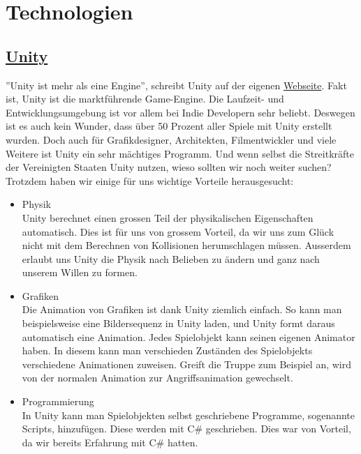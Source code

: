 \chapter{Technologien}

\section{\href{https://unity.com/}{Unity}}
''Unity ist mehr als eine Engine'', schreibt Unity auf der eigenen \href{https://unity.com/pages/more-than-an-engine}{Webseite}. Fakt ist, Unity ist die marktführende Game-Engine. Die Laufzeit- und Entwicklungsumgebung 
ist vor allem bei \gls{Indie Developer}n sehr beliebt. Deswegen ist es auch kein Wunder, dass über 50 Prozent aller Spiele mit Unity erstellt wurden. 
Doch auch für Grafikdesigner, Architekten, Filmentwickler und viele Weitere ist Unity ein sehr mächtiges Programm. Und wenn selbst die Streitkräfte der Vereinigten Staaten Unity nutzen, wieso sollten wir 
noch weiter suchen? Trotzdem haben wir einige für uns wichtige Vorteile herausgesucht:\\

\begin{itemize}
    \item Physik \\
        Unity berechnet einen grossen Teil der physikalischen Eigenschaften automatisch. Dies ist für uns von grossem Vorteil, da wir uns zum Glück nicht mit dem Berechnen von Kollisionen herumschlagen müssen.
        Ausserdem erlaubt uns Unity die Physik nach Belieben zu ändern und ganz nach unserem Willen zu formen.
    \item Grafiken \\
    Die Animation von Grafiken ist dank Unity ziemlich einfach. So kann man beispielsweise eine Bildersequenz in Unity laden, und Unity formt daraus automatisch eine Animation. Jedes Spielobjekt kann seinen
        eigenen Animator haben. In diesem kann man verschieden Zuständen des Spielobjekts verschiedene Animationen zuweisen. Greift die Truppe zum Beispiel an, wird von der normalen Animation zur Angriffsanimation
        gewechselt.
    \item Programmierung \\
    In Unity kann man Spielobjekten selbst geschriebene Programme, sogenannte Scripts, hinzufügen. Diese werden mit C\# geschrieben. Dies war von Vorteil, da wir bereits Erfahrung mit C\# hatten. 
\end{itemize}

